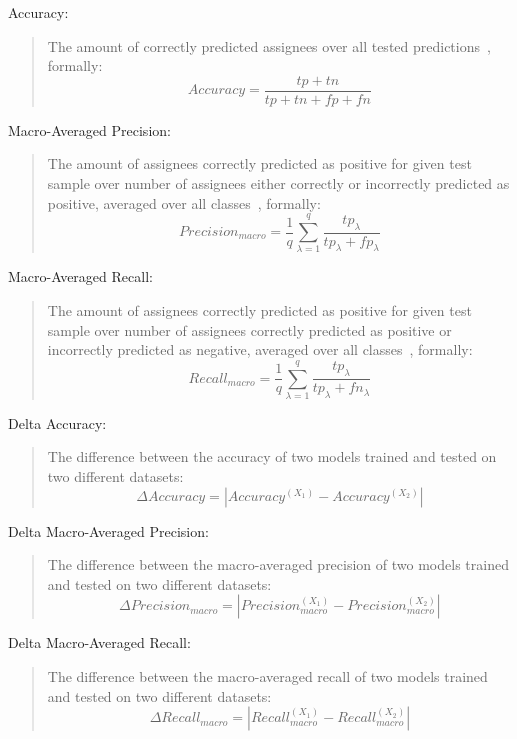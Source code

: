 \begin{framed}
  \hypertarget{metric:a}{Accuracy:}
  \begin{quote}
    The amount of correctly predicted assignees over all tested predictions~\cite{manning2008introduction}, formally:
    $$Accuracy = \frac{tp+tn}{tp+tn+fp+fn}$$
  \end{quote}

  \hypertarget{metric:p}{Macro-Averaged Precision:}
  \begin{quote}
    The amount of assignees correctly predicted as positive for given test sample over number of assignees either correctly or incorrectly predicted as positive, averaged over all classes~\cite{Asch2013}, formally:
    $$Precision_{macro} = \frac{1}{q}\sum_{\lambda=1}^q\frac{tp_{\lambda}}{tp_{\lambda}+fp_{\lambda}}$$
  \end{quote}

  \hypertarget{metric:r}{Macro-Averaged Recall:}
  \begin{quote}
    The amount of assignees correctly predicted as positive for given test sample over number of assignees correctly predicted as positive or incorrectly predicted as negative, averaged over all classes~\cite{Asch2013}, formally:
    $$Recall_{macro} = \frac{1}{q}\sum_{\lambda=1}^q\frac{tp_{\lambda}}{tp_{\lambda}+fn_{\lambda}}$$ 
  \end{quote}

  \hypertarget{metric:da}{Delta Accuracy:}
  \begin{quote}
    The difference between the accuracy of two models trained and tested on two different datasets:
    $$\Delta Accuracy = |Accuracy^{(X_1)} - Accuracy^{(X_2)}|$$
  \end{quote}

  \hypertarget{metric:dp}{Delta Macro-Averaged Precision:}
  \begin{quote}
    The difference between the macro-averaged precision of two models trained and tested on two different datasets:
    $$\Delta Precision_{macro} = |Precision_{macro}^{(X_1)} - Precision_{macro}^{(X_2)}|$$
  \end{quote}

  \hypertarget{metric:dr}{Delta Macro-Averaged Recall:}
  \begin{quote}
    The difference between the macro-averaged recall of two models trained and tested on two different datasets:
    $$\Delta Recall_{macro} = |Recall_{macro}^{(X_1)} - Recall_{macro}^{(X_2)}|$$
  \end{quote}


\end{framed}
